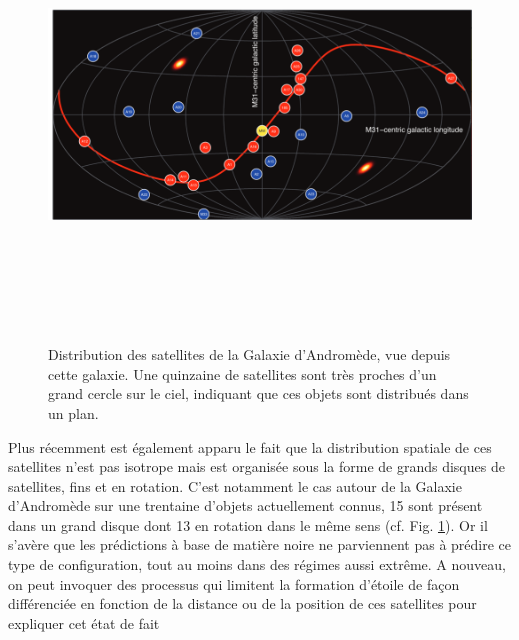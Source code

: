 \begin{figure}[htbp]
	\centering
		\includegraphics[height=12cm]{figs/planM31.png}
	\caption[Distribution des satellites de la Galaxie d'Andromède]{Distribution des satellites de la Galaxie d'Andromède, vue depuis cette galaxie. Une quinzaine de satellites sont très proches d'un grand cercle sur le ciel, indiquant que ces objets sont distribués dans un plan.} 
	\label{f:planM31}
\end{figure}

Plus récemment est également apparu le fait que la distribution spatiale de ces satellites n'est pas isotrope mais est organisée sous la forme de grands disques de satellites, fins et en rotation. C'est notamment le cas autour de la Galaxie d'Andromède sur une trentaine d'objets actuellement connus, 15 sont présent dans un grand disque dont 13 en rotation dans le même sens (cf. Fig. \ref{f:planM31}). Or il s'avère que les prédictions à base de matière noire ne parviennent pas à prédire ce type de configuration, tout au moins dans des régimes aussi extrême.  A nouveau, on peut invoquer des processus qui limitent la formation d'étoile de façon différenciée en fonction de la distance ou de la position de ces satellites pour expliquer cet état de fait 

